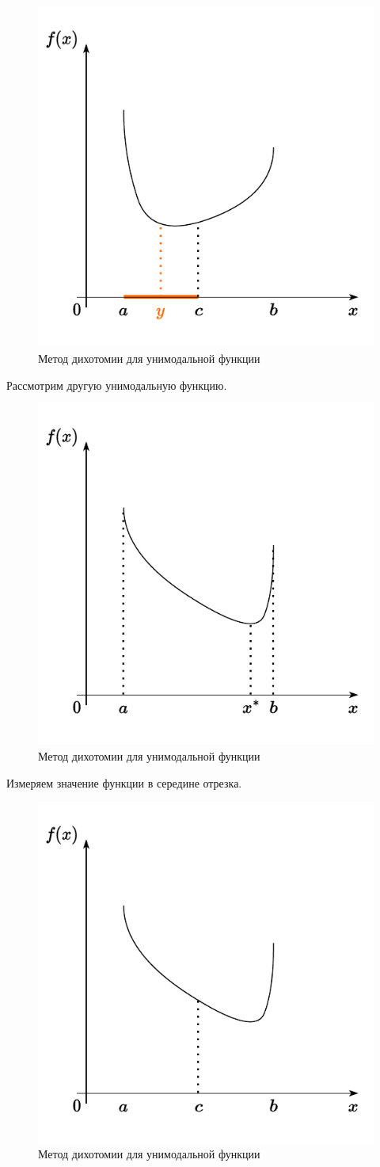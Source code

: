 \documentclass[
  russian,
  letterpaper,
  DIV=11,
  numbers=noendperiod]{scrartcl}
\begin{document}
\begin{figure}[H]

{\centering \includegraphics[width=0.4\linewidth,height=\textheight,keepaspectratio]{Dichotomy4.pdf}

}

\caption{Метод дихотомии для унимодальной функции}

\end{figure}%

Рассмотрим другую унимодальную функцию.

\begin{figure}[H]

{\centering \includegraphics[width=0.4\linewidth,height=\textheight,keepaspectratio]{Dichotomy5.pdf}

}

\caption{Метод дихотомии для унимодальной функции}

\end{figure}%

Измеряем значение функции в середине отрезка.

\begin{figure}[H]

{\centering \includegraphics[width=0.4\linewidth,height=\textheight,keepaspectratio]{Dichotomy6.pdf}

}

\caption{Метод дихотомии для унимодальной функции}

\end{figure}%
\end{document}

